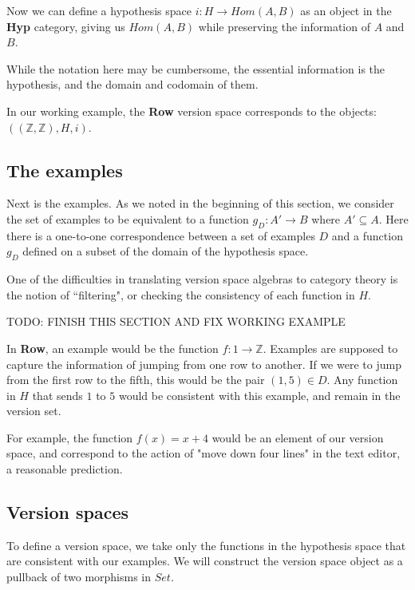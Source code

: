 \documentclass{article}
\theoremstyle{definition}
\begin{document}
Now we can define a hypothesis space $i:H\rightarrow Hom(A,B)$ as an object in the \textbf{Hyp} category, giving us $Hom(A,B)$ while preserving the information of $A$ and $B$.

While the notation here may be cumbersome, the essential information is the hypothesis, and the domain and codomain of them.    

In our working example, the \textbf{Row} version space corresponds to the objects: $((\mathbb{Z}, \mathbb{Z}), H, i)$. 


\subsection{The examples}
Next is the examples. As we noted in the beginning of this section, we consider the set of examples to be equivalent to a function $g_D: A' \rightarrow B$ where $A' \subseteq A$.  Here there is a one-to-one correspondence between a set of examples $D$ and a function $g_D$ defined on a subset of the domain of the hypothesis space. 

One of the difficulties in translating version space algebras to category theory is the notion of ``filtering", or checking the consistency of each function in $H$. 


TODO: FINISH THIS SECTION AND FIX WORKING EXAMPLE

In \textbf{Row}, an example would be the function $f: {1} \rightarrow \mathbb{Z}$. Examples are supposed to capture the information of jumping from one row to another. If we were to jump from the first row to the fifth, this would be the pair $(1,5)\in D$. Any function in $H$ that sends $1$ to $5$ would be consistent with this example, and remain in the version set. 

For example, the function $f(x) = x + 4$ would be an element of our version space, and correspond to the action of "move down four lines" in the text editor, a reasonable prediction. 

\subsection{Version spaces}
To define a version space, we take only the functions in the hypothesis space that are consistent with our examples. We will construct the version space object as a pullback of two morphisms in $Set$. 
\end{document}
